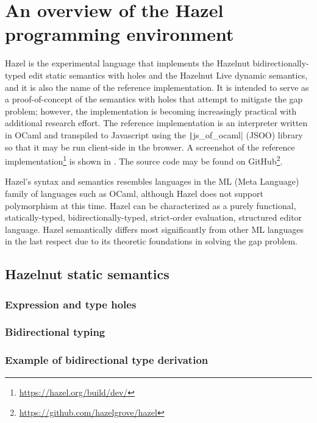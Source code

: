 \section{An overview of the Hazel programming environment}
\label{sec:hazel}


Hazel is the experimental language that implements the Hazelnut bidirectionally-typed edit static semantics with holes and the Hazelnut Live dynamic semantics, and it is also the name of the reference implementation. It is intended to serve as a proof-of-concept of the semantics with holes that attempt to mitigate the gap problem; however, the implementation is becoming increasingly practical with additional research effort. The reference implementation is an interpreter written in OCaml and transpiled to Javascript using the \texttt|js_of_ocaml| (JSOO) library \cite{vouillon2014bytecode} so that it may be run client-side in the browser. A screenshot of the reference implementation\footnote{\url{https://hazel.org/build/dev/}} is shown in . The source code may be found on GitHub\footnote{\url{https://github.com/hazelgrove/hazel}}.

Hazel's syntax and semantics resembles languages in the ML (Meta Language) family of languages such as OCaml, although Hazel does not support polymorphism at this time. Hazel can be characterized as a purely functional, statically-typed, bidirectionally-typed, strict-order evaluation, structured editor language. Hazel semantically differs most significantly from other ML languages in the last respect due to its theoretic foundations in solving the gap problem.

\subsection{Hazelnut static semantics}
\label{sec:statics}

\subsubsection{Expression and type holes}
\label{sec:holes}

\subsubsection{Bidirectional typing}
\label{sec:bidirectional_typing}

\subsubsection{Example of bidirectional type derivation}
\label{sec:typing_example}

